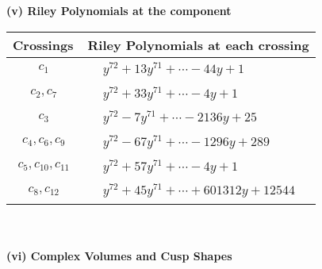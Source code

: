 \documentclass[1p]{elsarticle_modified}
\theoremstyle{definition}
\begin{document}
\newpage\renewcommand{\arraystretch}{1}
\flushleft \textbf{(v) Riley Polynomials at the component}\newline \\
\begin{tabular}{m{50pt}|m{274pt}}
Crossings & \hspace{64pt}Riley Polynomials at each crossing \\
\hline $$\begin{aligned}c_{1}\end{aligned}$$&$\begin{aligned}
&y^{72}+13 y^{71}+\cdots-44 y+1
\end{aligned}$\\
\hline $$\begin{aligned}c_{2},c_{7}\end{aligned}$$&$\begin{aligned}
&y^{72}+33 y^{71}+\cdots-4 y+1
\end{aligned}$\\
\hline $$\begin{aligned}c_{3}\end{aligned}$$&$\begin{aligned}
&y^{72}-7 y^{71}+\cdots-2136 y+25
\end{aligned}$\\
\hline $$\begin{aligned}c_{4},c_{6},c_{9}\end{aligned}$$&$\begin{aligned}
&y^{72}-67 y^{71}+\cdots-1296 y+289
\end{aligned}$\\
\hline $$\begin{aligned}c_{5},c_{10},c_{11}\end{aligned}$$&$\begin{aligned}
&y^{72}+57 y^{71}+\cdots-4 y+1
\end{aligned}$\\
\hline $$\begin{aligned}c_{8},c_{12}\end{aligned}$$&$\begin{aligned}
&y^{72}+45 y^{71}+\cdots+601312 y+12544
\end{aligned}$\\
\hline
\end{tabular}\\~\\
\newpage\flushleft \textbf{(vi) Complex Volumes and Cusp Shapes}
\end{document}
